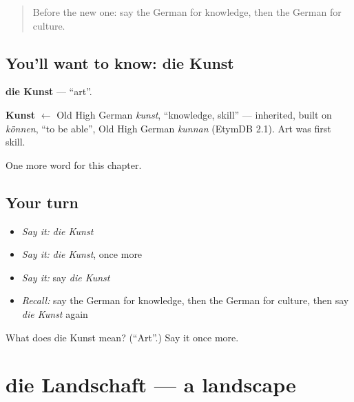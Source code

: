 \label{lesson:GE-C232-kunst}



\begin{quote}
Before the new one: say the German for knowledge, then the German for culture.
\end{quote}

\subsection*{You'll want to know: die Kunst}
\textbf{die Kunst} — \textquotedblleft{}art\textquotedblright{}.

\begin{cousinweb}
\textbf{Kunst} $\leftarrow$ Old High German \emph{kunst}, \textquotedblleft{}knowledge, skill\textquotedblright{} — inherited, built on \emph{können}, \textquotedblleft{}to be able\textquotedblright{}, Old High German \emph{kunnan} (EtymDB 2.1). Art was first skill.
\end{cousinweb}

\begin{grammarlens}[title={What you've built}]
One more word for this chapter.
\end{grammarlens}

\subsection*{Your turn}
\begin{itemize}
\raggedright
  \item \emph{Say it:} \emph{die Kunst}
  \item \emph{Say it:} \emph{die Kunst}, once more
  \item \emph{Say it:} say \emph{die Kunst}
  \item \emph{Recall:} say the German for knowledge, then the German for culture, then say \emph{die Kunst} again
\end{itemize}

\begin{tcolorbox}[breakable,colback=teal!4,colframe=teal!35!black,title={Before you move on}]
What does die Kunst mean? (\textquotedblleft{}Art\textquotedblright{}.) Say it once more.
\end{tcolorbox}
\section[die Landschaft]{die Landschaft — a landscape}

\label{lesson:GE-C232-landschaft}



